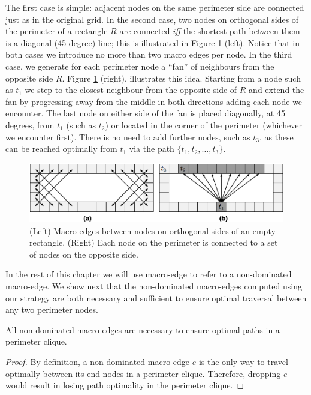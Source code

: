 The first case is simple: adjacent nodes on the same perimeter side are connected
just as in the original grid. 
In the second case, two nodes on orthogonal sides of the perimeter of a rectangle
$R$ are connected \emph{iff} the shortest path between them is a diagonal
(45-degree) line; this is illustrated in Figure \ref{fig::rsr::macroedges} (left).
Notice that in both cases we introduce no more than two macro edges per node.
In the third case, we generate for each perimeter node a ``fan'' of neighbours
from the opposite side $R$.  Figure \ref{fig::rsr::macroedges} (right), illustrates
this idea.  Starting from a node such as $t_{1}$ we step to the closest
neighbour from the opposite side of $R$ and extend the fan by progressing away
from the middle in both directions adding each node we encounter.  The last node
on either side of the fan is placed diagonally, at 45 degrees, from $t_{1}$
(such as $t_{2}$) or located in the corner of the perimeter (whichever we
encounter first).  There is no need to add further nodes, such as $t_{3}$, as
these can be reached optimally from $t_1$ via the path $\lbrace t_1, t_2, \dots,
t_3\rbrace$.

\begin{figure}[tb]
       \begin{center}
		   \includegraphics[width=0.95\columnwidth, trim = 10mm 10mm 10mm 0mm]
			{chapter_rsr/diagrams/macroedges_wide.png}
       \end{center}
	\vspace{-3pt}
       \caption[Rectangular Symmetry Reduction on 8-connected maps]
{\small
(Left) Macro edges between nodes on orthogonal sides of an empty
rectangle. (Right) Each node on the perimeter is connected to a set of 
nodes on the opposite side.}
       \label{fig::rsr::macroedges}
\end{figure}

In the rest of this chapter we will use macro-edge to refer to a non-dominated
macro-edge.  We show next that the non-dominated macro-edges computed using
our strategy are both necessary and sufficient to ensure optimal traversal
between any two perimeter nodes.

\begin{proposition} All non-dominated macro-edges are necessary to ensure
optimal paths in a perimeter clique.  
\end{proposition} 
\begin{proof} By
definition, a non-dominated macro-edge $e$ is the only way to travel optimally
between its end nodes in a perimeter clique. Therefore, dropping $e$ would
result in losing path optimality in the perimeter clique.  
\end{proof}

